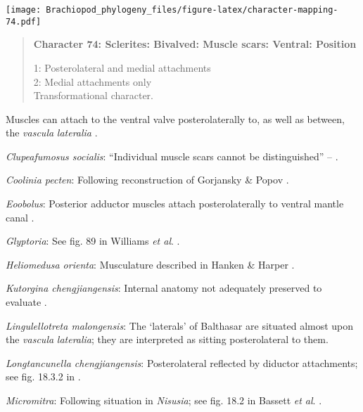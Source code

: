 \documentclass[openany]{book}
\theoremstyle{definition}
\theoremstyle{definition}
\theoremstyle{definition}
\theoremstyle{remark}
\begin{document}
\texttt{[image: Brachiopod\_phylogeny\_files/figure-latex/character-mapping-74.pdf]}

\begin{quote}
\textbf{Character 74: Sclerites: Bivalved: Muscle scars: Ventral:
Position}

1: Posterolateral and medial attachments\\
2: Medial attachments only\\
Transformational character.
\end{quote}

Muscles can attach to the ventral valve posterolaterally to, as well as
between, the \emph{vascula} \emph{lateralia}
\citep{Popov1992TheCambrian}.

\hypertarget{Clupeafumosus_socialis-coding-74}{}
\emph{Clupeafumosus socialis}: ``Individual muscle scars cannot be
distinguished'' -- \citet{Holmer2006Aspinose}.

\hypertarget{Coolinia_pecten-coding-74}{}
\emph{Coolinia pecten}: Following reconstruction of Gorjansky \& Popov
\citeyearpar{Gorjansky1986Onthe}.

\hypertarget{Eoobolus-coding-74}{}
\emph{Eoobolus}: Posterior adductor muscles attach posterolaterally to
ventral mantle canal \citep{Robinson2014Themuscles}.

\hypertarget{Glyptoria-coding-74}{}
\emph{Glyptoria}: See fig. 89 in Williams \emph{et al}.
\citeyearpar{Williams2000LinguliformeaCraniiformea}.

\hypertarget{Heliomedusa_orienta-coding-74}{}
\emph{Heliomedusa orienta}: Musculature described in Hanken \& Harper
\citeyearpar{Hanken1985Thetaxonomy}.

\hypertarget{Kutorgina_chengjiangensis-coding-74}{}
\emph{Kutorgina chengjiangensis}: Internal anatomy not adequately
preserved to evaluate \citep{Nikitin1984}.

\hypertarget{Lingulellotreta_malongensis-coding-74}{}
\emph{Lingulellotreta malongensis}: The `laterals' of Balthasar
\citeyearpar[fig. 5]{Balthasar2009Thebrachiopod} are situated almost
upon the \emph{vascula} \emph{lateralia}; they are interpreted as
sitting posterolateral to them.

\hypertarget{Longtancunella_chengjiangensis-coding-74}{}
\emph{Longtancunella chengjiangensis}: Posterolateral reflected by
diductor attachments; see fig. 18.3.2 in
\citet{Bassett2001Functionalmorphology}.

\hypertarget{Micromitra-coding-74}{}
\emph{Micromitra}: Following situation in \emph{Nisusia}; see fig. 18.2
in Bassett \emph{et al}. \citeyearpar{Bassett2001Functionalmorphology}.
\end{document}
